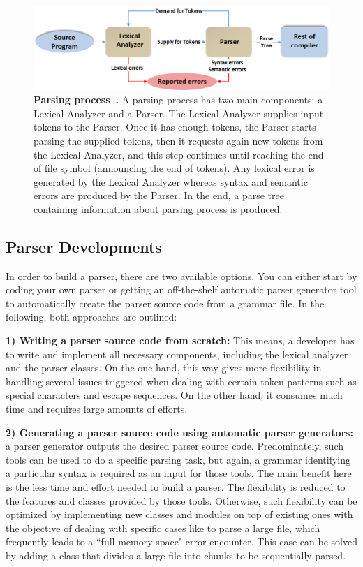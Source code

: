 \begin{figure}[ht]
	\begin{center}	\setlength\belowcaptionskip{-5mm}
	\includegraphics[scale=0.55,angle=0]{images/ParserRole}
	\caption{\textbf{Parsing process~\citep{JCOMP:Tool:Online}.} A parsing process has two main components: a Lexical Analyzer and a Parser. 
	The Lexical Analyzer supplies input tokens to the Parser.
	Once it has enough tokens, the Parser starts parsing the supplied tokens, then it requests again new tokens from the Lexical Analyzer, and this step continues until reaching the end of file symbol (announcing the end of tokens).	Any lexical error is generated by the Lexical Analyzer whereas syntax and semantic errors are produced by the Parser.
	In the end, a parse tree containing information about parsing process is produced.}
		\label{Fig:parserPosition}
	\end{center}
\end{figure}

\subsection{Parser Developments}
In order to build a parser, there are two available options. You can either start by coding your own parser or getting an off-the-shelf automatic parser generator tool to automatically create the parser source code from a grammar file. 
In the following, both approaches are outlined:

\textbf{1) Writing a parser source code from scratch:} This means, a developer has to write and implement all necessary components, including the lexical analyzer and the parser classes. 
On the one hand, this way gives more flexibility in handling several issues triggered when dealing with certain token patterns such as special characters and escape sequences. 
On the other hand, it consumes much time and requires large amounts of efforts.

\textbf{2) Generating a parser source code using automatic parser generators:} a parser generator outputs the desired parser source code. 
Predominately, such tools can be used to do a specific parsing task, but again, a grammar identifying a particular syntax is required as an input for those tools. 
The main benefit here is the less time and effort needed to build a parser.
The flexibility is reduced to the features and classes provided by those tools.
Otherwise, such flexibility can be optimized by implementing new classes and modules on top of existing ones with the objective of dealing with specific cases like to parse a large file, which frequently leads to a ``full memory space" error encounter.
This case can be solved by adding a class that divides a large file into chunks to be sequentially parsed.  

